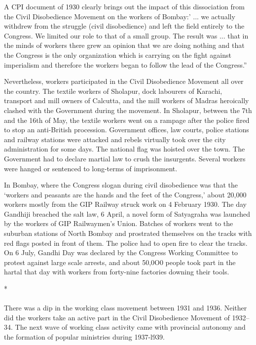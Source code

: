 A CPI document of 1930 clearly brings out the impact of this dissociation from the Civil Disobedience Movement on the workers of Bombay:' ... we actually withdrew from the struggle (civil disobedience) and left the field entirely to the Congress. We limited our role to that of a small group. The result was ... that in the minds of workers there grew an opinion that we are doing nothing and that the Congress is the only organization which is carrying on the fight against imperialism and therefore the workers began to follow the lead of the Congress.''

Nevertheless, workers participated in the Civil Disobedience Movement all over the country. The textile workers of Sholapur, dock labourers of Karachi, transport and mill owners of Calcutta, and the mill workers of Madras heroically clashed with the Government during the movement. In Sholapur, between the 7th and the 16th of May, the textile workers went on a rampage after the police fired to stop an anti-British procession. Government offices, law courts, police stations and railway stations were attacked and rebels virtually took over the city administration for some days. The national flag was hoisted over the town. The Government had to declare martial law to crush the insurgents. Several workers were hanged or sentenced to long-terms of imprisonment.

In Bombay, where the Congress slogan during civil disobedience was that the `workers and peasants are the hands and the feet of the Congress,' about 20,000 workers mostly from the GIP Railway struck work on 4 February 1930. The day Gandhiji breached the salt law, 6 April, a novel form of Satyagraha was launched by the workers of GIP Railwaymen's Union. Batches of workers went to the suburban stations of North Bombay and prostrated themselves on the tracks with red flags posted in front of them. The police had to open fire to clear the tracks. On 6 July, Gandhi Day was declared by the Congress Working Committee to protest against large scale arrests, and about 50,0O0 people took part in the hartal that day with workers from forty-nine factories downing their tools.

\begin{center}*\end{center}

\paragraph*{}


There was a dip in the working class movement between 1931 and 1936. Neither did the workers take an active part in the Civil Disobedience Movement of 1932--34. The next wave of working class activity came with provincial autonomy and the formation of popular ministries during 1937-l939.

